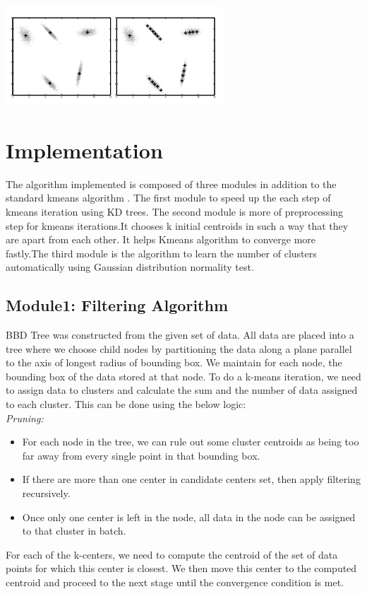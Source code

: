 \documentclass[conference]{IEEEtran}
\begin{document}
\includegraphics[scale =0.80]{GvsK.png}
 
\section{Implementation}
The algorithm implemented is composed of three modules in addition to the standard kmeans algorithm . The first module to speed up the each step of kmeans iteration using KD trees. The second module is more of preprocessing step for kmeans iterations.It chooses k initial centroids in such a way that they are apart from each other. It helps Kmeans algorithm to converge more fastly.The third module is the algorithm to learn the number of clusters automatically using Gaussian distribution normality test.

\subsection{Module1: Filtering Algorithm }
BBD Tree was constructed from the given set of data. All data are placed into a tree where we choose child nodes by partitioning the data along a plane parallel to the axis of longest radius of bounding box. We maintain for each node, the bounding box of the data stored at that node.  To do a k-means iteration, we need to assign data to clusters and calculate the sum and the number of data assigned to each cluster. This can be done using the below logic:\\ \textit{Pruning:} \begin{itemize}
  \item For each node in the tree, we can rule out some cluster centroids as being too far away from every single point in that bounding box.
  \item If there are more than one center in candidate centers set, then apply filtering recursively.
  \item Once only one center is left in the node, all data in the node can be assigned to that cluster in batch.
\end{itemize}  For each of the k-centers, we need to compute the centroid of the set of data points for which this center is closest. We then move this center to the computed centroid and proceed to the next stage until the convergence condition is met.
\end{document}
